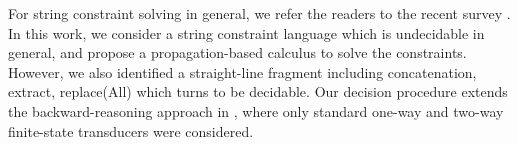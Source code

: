 
For string constraint solving in general, we refer the readers to the recent survey \cite{Ama20}. In this work, we consider a string constraint language which is undecidable in general, and propose a propagation-based calculus to solve the constraints. However, we also identified a straight-line fragment including concatenation, extract, replace(All) which turns to be decidable. Our decision procedure extends the backward-reasoning approach in \cite{CHL+19}, where only standard one-way and two-way finite-state transducers were considered. 
